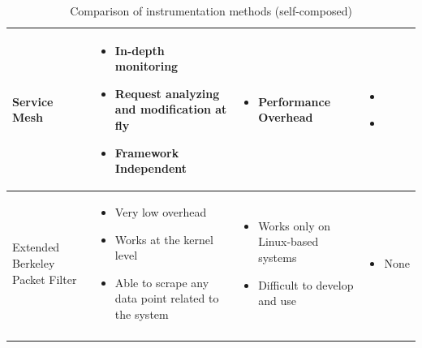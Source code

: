 \begin{longtable}{| p{23mm} | p{42mm} | p{42mm} | p{42mm} |}
    Service Mesh &
    \vspace{-8mm}
    \begin{itemize}[leftmargin=0mm,noitemsep,nolistsep,label={}] 
        \item In-depth monitoring
        \item Request analyzing and modification at fly
        \item Framework Independent
        \vspace{-7mm}
    \end{itemize} &
    \vspace{-8mm}
    \begin{itemize}[leftmargin=0mm,noitemsep,nolistsep,label={}] 
        \item Performance Overhead
        \vspace{-7mm}
    \end{itemize} &
    \vspace{-8mm}
    \begin{itemize}[leftmargin=0mm,noitemsep,nolistsep,label={}] 
        \item \cite{samir2019dla}
        \item \cite{wu2020microrca}
        \vspace{-7mm}
    \end{itemize} \\ \hline
    
    Extended Berkeley Packet Filter &
    \vspace{-8mm}
    \begin{itemize}[leftmargin=0mm,noitemsep,nolistsep,label={}] 
        \item Very low overhead
        \item Works at the kernel level
        \item Able to scrape any data point related to the system
        \vspace{-7mm}
    \end{itemize} &
    \vspace{-8mm}
    \begin{itemize}[leftmargin=0mm,noitemsep,nolistsep,label={}] 
        \item Works only on Linux-based systems
        \item Difficult to develop and use
        \vspace{-7mm}
    \end{itemize} &
    \vspace{-8mm}
    \begin{itemize}[leftmargin=0mm,noitemsep,nolistsep,label={}] 
        \item None
        \vspace{-7mm}
    \end{itemize} \\ \hline

    \caption{Comparison of instrumentation methods (self-composed)}
\end{longtable}


